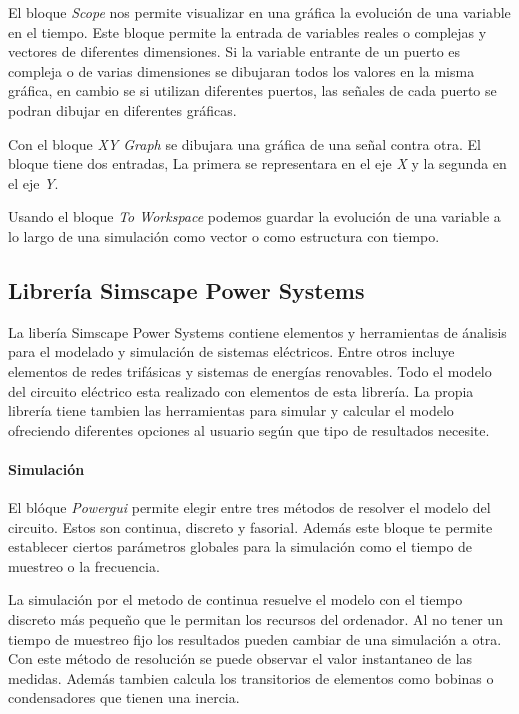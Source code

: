 \documentclass{book}
\begin{document}
El bloque \emph{Scope} nos permite visualizar en una gr\'afica la evoluci\'on de una variable en el tiempo. Este bloque permite la entrada de variables reales o complejas y vectores de diferentes dimensiones. Si la variable entrante de un puerto es compleja o de varias dimensiones se dibujaran todos los valores en la misma gr\'afica, en cambio se si utilizan diferentes puertos, las señales de cada puerto se podran dibujar en diferentes gr\'aficas.  \par

Con el bloque \emph{XY Graph} se dibujara una gr\'afica de una señal contra otra. El bloque tiene dos entradas, La primera se representara en el eje \emph{X} y la segunda en el eje \emph{Y}.  \par

Usando el bloque \emph{To Workspace} podemos guardar la evoluci\'on de una variable a lo largo de una simulaci\'on como vector o como estructura con tiempo.  \par

		\subsection{Librer\'ia Simscape Power Systems}

La liber\'ia Simscape Power Systems contiene elementos y herramientas de \'analisis para el modelado y simulaci\'on de sistemas el\'ectricos. Entre otros incluye elementos de redes trif\'asicas y sistemas de energ\'ias renovables. Todo el modelo del circuito el\'ectrico esta realizado con elementos de esta librer\'ia. La propia librer\'ia tiene tambien las herramientas para simular y calcular el modelo ofreciendo diferentes opciones al usuario seg\'un que tipo de resultados necesite. \par

		\paragraph {Simulaci\'on}
El bl\'oque \emph{Powergui} permite elegir entre tres m\'etodos de resolver el modelo del circuito. Estos son continua, discreto y fasorial. Adem\'as este bloque te permite establecer ciertos par\'ametros globales para la simulaci\'on como el tiempo de muestreo o la frecuencia.  \par

La simulaci\'on por el metodo de continua resuelve el modelo con el tiempo discreto m\'as pequeño que le permitan los recursos del ordenador. Al no tener un tiempo de muestreo fijo los resultados pueden cambiar de una simulaci\'on a otra. Con este m\'etodo de resoluci\'on se puede observar el valor instantaneo de las medidas. Adem\'as tambien calcula  los transitorios de elementos como bobinas o condensadores que tienen una inercia. \par
\end{document}
